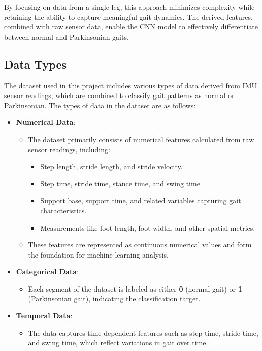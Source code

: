 By focusing on data from a single leg, this approach minimizes complexity while retaining the ability to capture meaningful gait dynamics. The derived features, combined with raw sensor data, enable the CNN model to effectively differentiate between normal and Parkinsonian gaits. \cite{ZhangWenwen:2022}

\subsection{Data Types}

The dataset used in this project includes various types of data derived from IMU sensor readings, which are combined to classify gait patterns as normal or Parkinsonian. The types of data in the dataset are as follows:

\begin{itemize}
	\item \textbf{Numerical Data}:
	\begin{itemize}
		\item The dataset primarily consists of numerical features calculated from raw sensor readings, including:
		\begin{itemize}
			\item Step length, stride length, and stride velocity.
			\item Step time, stride time, stance time, and swing time.
			\item Support base, support time, and related variables capturing gait characteristics.
			\item Measurements like foot length, foot width, and other spatial metrics.
		\end{itemize}
		\item These features are represented as continuous numerical values and form the foundation for machine learning analysis.
	\end{itemize}
	
	\item \textbf{Categorical Data}:
	\begin{itemize}
		\item Each segment of the dataset is labeled as either \textbf{0} (normal gait) or \textbf{1} (Parkinsonian gait), indicating the classification target.
	\end{itemize}
	
	\item \textbf{Temporal Data}:
	\begin{itemize}
		\item The data captures time-dependent features such as step time, stride time, and swing time, which reflect variations in gait over time.
	\end{itemize}
\end{itemize}

